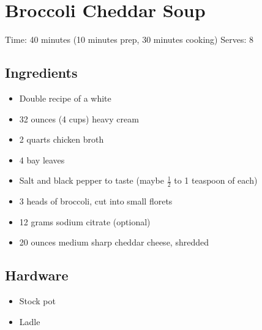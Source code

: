 \section{Broccoli Cheddar Soup}
\label{broccoliCheddarSoup}
\setcounter{secnumdepth}{0}
Time: 40 minutes (10 minutes prep, 30 minutes cooking)
Serves: 8

\begin{multicols}{2}
\subsection*{Ingredients}
\begin{itemize}
    \item Double recipe of a white 
    \item 32 ounces (4 cups) heavy cream
    \item 2 quarts chicken broth
    \item 4 bay leaves
    \item Salt and black pepper to taste (maybe \( \frac{1}{2} \) to 1 teaspoon of each)
    \item 3 heads of broccoli, cut into small florets
    \item 12 grams sodium citrate (optional)
    \item 20 ounces medium sharp cheddar cheese, shredded
\end{itemize}

\subsection*{Hardware}
\begin{itemize}
    \item Stock pot
    \item Ladle
\end{itemize}
\clearpage


\end{multicols}
